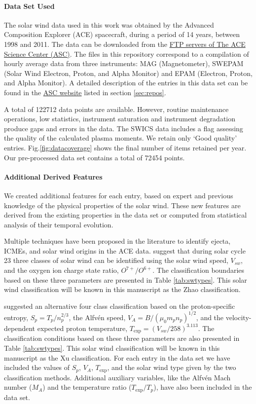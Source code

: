 \paragraph{Data Set Used}
The solar wind data used in this work was obtained by the Advanced Composition Explorer (ACE) spacecraft, during a period of 14 years, between 1998 and 2011. The data can be downloaded from the \href{ftp://mussel.srl.caltech.edu/pub/ace/level2/multi}{FTP servers of The ACE Science Center (ASC)}. The files in this repository correspond to a compilation of hourly average data from three instruments: MAG (Magnetometer), SWEPAM (Solar Wind Electron, Proton, and Alpha Monitor) and EPAM (Electron, Proton, and Alpha Monitor). A detailed description of the entries in this data set can be found in the \href{http://www.srl.caltech.edu/cgi-bin/dib/rundibviewmultil2/ACE/ASC/DATA/level2/multi}{ASC website} listed in section \ref{sec:repos}.

A total of 122712 data points are available. However, routine maintenance operations, low statistics, instrument saturation and instrument degradation produce gaps and errors in the data. The SWICS data includes a flag assessing the quality of the calculated plasma moments. We retain only `Good quality' entries. Fig.\ref{fig:datacoverage} shows the final number of items retained per year. Our pre-processed data set contains a total of 72454 points.

\paragraph{Additional Derived Features}
We created additional features for each entry, based on expert and previous knowledge of the physical properties of the solar wind. These new features are derived from the existing properties in the data set or computed from statistical analysis of their temporal evolution.

Multiple techniques have been proposed in the literature to identify ejecta, ICMEs, and solar wind origins in the ACE data. \citep{Zhao2009} suggest that during solar cycle 23 three classes of solar wind can be identified using the solar wind speed, $V_{sw}$, and the oxygen ion charge state ratio, $O^{7+}/O^{6+}$. The classification boundaries based on these three parameters are presented in Table \ref{tab:swtypes}. This solar wind classification will be known in this manuscript as the Zhao classification.

\citep{Xu2015} suggested an alternative four class classification based on the proton-specific entropy, $S_p = T_p/n_p^{2/3}$, the Alfv\'en speed, $V_A = B / (\mu_0 m_p n_p)^{1/2}$, and the velocity-dependent expected proton temperature, $T_\text{exp} = (V_{sw}/258)^{3.113}$. The classification conditions based on these three parameters are also presented in Table \ref{tab:swtypes}. This solar wind classification will be known in this manuscript as the Xu classification. For each entry in the data set we have included the values of $S_p$, $V_A$, $T_\text{exp}$, and the solar wind type given by the two classification methods. Additional auxiliary variables, like the Alfv\'en Mach number ($M_A$) and the temperature ratio ($T_\text{exp}/T_p$), have also been included in the data set.

